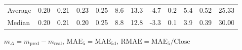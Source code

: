 \begin{threeparttable}
{\begin{tabular}{lrrrrrrrrrrr}
Average &          0.20 &          0.21 &          0.23 &        0.25 &                 8.6 &                13.3 &       -4.7 &                 0.2 &              5.4 &            0.52 &                  25.33 \\
 Median &          0.20 &          0.21 &          0.20 &        0.25 &                 8.8 &                12.8 &       -3.3 &                 0.1 &              3.9 &            0.39 &                  30.00 \\
\bottomrule
\end{tabular}
}
\begin{tablenotes}\footnotesize
\item $m_\Delta=m_{\text{pred}}-m_{\text{real}}$,
$\mathrm{MAE}_5=\mathrm{MAE}_{5\text{d}}$,
$\mathrm{RMAE}=\mathrm{MAE}_5/\text{Close}$
\end{tablenotes}
\end{threeparttable}
\endgroup

